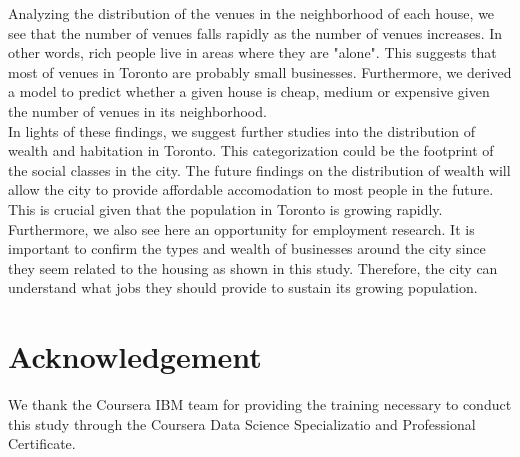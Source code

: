\documentclass{article}
\begin{document}
Analyzing the distribution of the venues in the neighborhood of each house, we see that the number of venues falls rapidly as the number of venues increases. In other words, rich people live in areas where they are "alone". This suggests that most of venues in Toronto are probably small businesses. Furthermore, we derived a model to predict whether a given house is cheap, medium or expensive given the number of venues in its neighborhood. \\

In lights of these findings, we suggest further studies into the distribution of wealth and habitation in Toronto. This categorization could be the footprint of the social classes in the city. The future findings on the distribution of wealth will allow the city to provide affordable accomodation to most people in the future. This is crucial given that the population in Toronto is growing rapidly. Furthermore, we also see here an opportunity for employment research. It is important to confirm the types and wealth of businesses around the city since they seem related to the housing as shown in this study. Therefore, the city can understand what jobs they should provide to sustain its growing population.

\section{Acknowledgement}

We thank the Coursera IBM team for providing the training necessary to conduct this study through the Coursera Data Science Specializatio and Professional Certificate.




\end{document}
